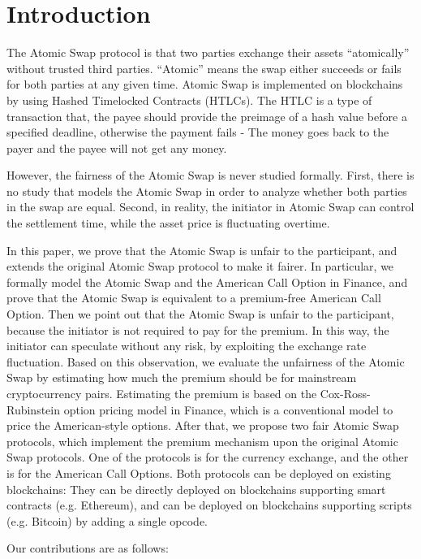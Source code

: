 \section{Introduction}
\label{sec:intro}

The Atomic Swap protocol is that two parties exchange their assets ``atomically'' without trusted third parties.
``Atomic'' means the swap either succeeds or fails for both parties at any given time.
Atomic Swap is implemented on blockchains by using Hashed Timelocked Contracts (HTLCs).
The HTLC is a type of transaction that, the payee should provide the preimage of a hash value before a specified deadline, otherwise the payment fails - The money goes back to the payer and the payee will not get any money.

However, the fairness of the Atomic Swap is never studied formally.
First, there is no study that models the Atomic Swap in order to analyze whether both parties in the swap are equal.
Second, in reality, the initiator in Atomic Swap can control the settlement time, while the asset price is fluctuating overtime.

In this paper, we prove that the Atomic Swap is unfair to the participant, and extends the original Atomic Swap protocol to make it fairer.
In particular, we formally model the Atomic Swap and the American Call Option in Finance,
and prove that the Atomic Swap is equivalent to a premium-free American Call Option.
Then we point out that the Atomic Swap is unfair to the participant, because the initiator is not required to pay for the premium.
In this way, the initiator can speculate without any risk, by exploiting the exchange rate fluctuation.
Based on this observation, we evaluate the unfairness of the Atomic Swap by estimating how much the premium should be for mainstream cryptocurrency pairs.
Estimating the premium is based on the Cox-Ross-Rubinstein option pricing model in Finance, which is a conventional model to price the American-style options.
After that, we propose two fair Atomic Swap protocols, which implement the premium mechanism upon the original Atomic Swap protocols.
One of the protocols is for the currency exchange, and the other is for the American Call Options.
Both protocols can be deployed on existing blockchains:
They can be directly deployed on blockchains supporting smart contracts (e.g. Ethereum),
and can be deployed on blockchains supporting scripts (e.g. Bitcoin) by adding a single opcode.

Our contributions are as follows:

